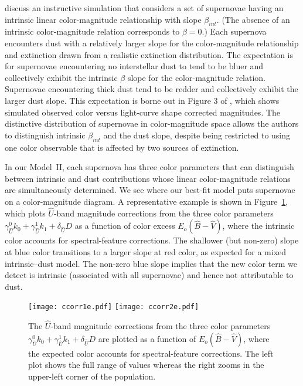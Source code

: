 \documentclass{aastex61}   	%
\begin{document}
 discuss an instructive simulation
that considers a set of
supernovae 
having an intrinsic linear color-magnitude relationship with slope $\beta_{\mathit{int}}$.
(The absence of an intrinsic color-magnitude relation corresponds to $\beta=0$.)
Each supernova encounters dust with a relatively larger slope
for the color-magnitude relationship and
extinction drawn from a realistic extinction distribution.
The expectation is for
supernovae encountering no interstellar dust  to tend to be bluer and
collectively exhibit the intrinsic $\beta$ slope for the color-magnitude
relation.  Supernovae encountering thick dust tend to be redder and collectively exhibit the larger dust  slope.
This expectation is borne out in Figure 3 of , which
shows  simulated
observed color versus light-curve shape corrected magnitudes.
The distinctive distribution of supernovae in color-magnitude space  allows
the authors to distinguish intrinsic $\beta_{\mathit{int}}$ and the dust slope,
despite being
restricted to using one color observable that is  affected by two sources of extinction.

In our Model~II, each supernova has three color parameters that can distinguish between
intrinsic and dust contributions whose linear color-magnitude relations are simultaneously determined.
We see where our best-fit model puts supernovae on a color-magnitude diagram.
A representative example is shown in Figure~\ref{speccorr:fig}, which plots
${\hat{U}}$-band magnitude corrections from the three color parameters $\gamma^0_{{\hat{U}}} k_0 +\gamma^1_{{\hat{U}}} k_1 + \delta_{\hat{U}} D$
as a function of color excess $E_o({\hat{B}}-{\hat{V}})$, where the intrinsic color accounts for spectral-feature corrections.
The shallower (but non-zero) slope at blue color transitions to a larger slope at red color, 
as expected  for a mixed intrinsic--dust model.
The non-zero blue slope implies that the new color term we detect is intrinsic (associated with all supernovae)
and hence not attributable to dust.

\begin{figure}[htbp] %
   \centering
   \texttt{[image: ccorr1e.pdf]}
   \texttt{[image: ccorr2e.pdf]}
      \caption{
      The ${\hat{U}}$-band magnitude corrections from the three color parameters $\gamma^0_{{\hat{U}}} k_0 +\gamma^1_{{\hat{U}}} k_1 + \delta_{\hat{U}} D$
are plotted as a function of $E_o({\hat{B}}-{\hat{V}})$, where the expected color accounts for spectral-feature corrections.  The left plot shows the full
range of values whereas the right zooms in the upper-left corner of the population.
   \label{speccorr:fig}}
\end{figure}
\end{document}

